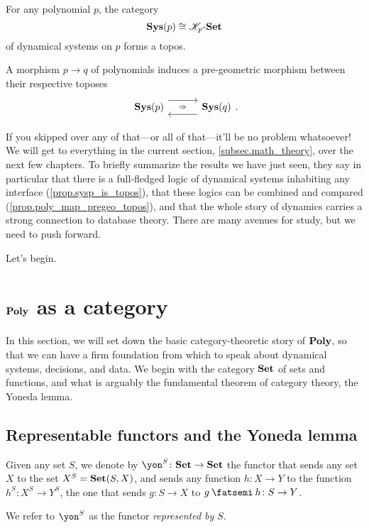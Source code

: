 \documentclass[DynamicalBook]{subfiles}
\begin{document}
\begin{proposition}[Niu]\label{prop.sysp_is_topos}
For any polynomial $p$, the category
\[\textbf{Sys}(p)\cong\mathscr{K}_p\textnormal{-}\textbf{Set}\]
of dynamical systems on $p$ forms a topos.
\end{proposition}

\begin{proposition}\label{prop.poly_map_pregeo_topos}
A morphism $p\to q$ of polynomials induces a pre-geometric morphism between their respective toposes
\[
\adj{\sys(p)}{}{}{\sys(q)}.
\]
\end{proposition}

If you skipped over any of that---or all of that---it'll be no problem whatsoever! We will get to everything in the current section, \ref{subsec.math_theory}, over the next few chapters. To briefly summarize the results we have just seen, they say in particular that there is a full-fledged logic of dynamical systems inhabiting any interface (\cref{prop.sysp_is_topos}), that these logics can be combined and compared (\cref{prop.poly_map_pregeo_topos}), and that the whole story of dynamics carries a strong connection to database theory. There are many avenues for study, but we need to push forward.

Let's begin.


\section{$\textbf{Poly}$ as a category}\label{sec.poly}


In this section, we will set down the basic category-theoretic story of $\textbf{Poly}$, so that we can have a firm foundation from which to speak about dynamical systems, decisions, and data. We begin with the category $\textbf{Set}$ of sets and functions, and what is arguably the fundamental theorem of category theory, the Yoneda lemma.

\subsection{Representable functors and the Yoneda lemma}

\begin{definition}
Given any set $S$, we denote by $\yon^S\colon\smset\to\smset$ the functor that sends any set $X$ to the set $X^S=\textbf{Set}(S,X)$, and sends any function $h\colon X\to Y$ to the function $h^S\colon X^S\to Y^S$, the one that sends $g\colon S\to X$ to $g\then h\colon S\to Y$.

We refer to $\yon^S$ as the functor \emph{represented by} $S$.
\end{definition}
\end{document}
